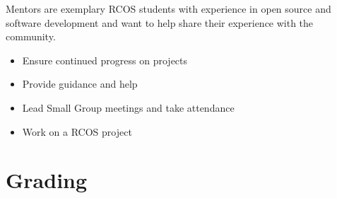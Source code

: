 \documentclass[12pt]{article}
\begin{document}
    Mentors are exemplary RCOS students with experience in open source and software development and want to help share their experience with the community. 

    \begin{itemize}
        \item Ensure continued progress on projects
        \item Provide guidance and help 
        \item Lead Small Group meetings and take attendance
        \item Work on a RCOS project
    \end{itemize}

    \section{Grading}

\end{document}
